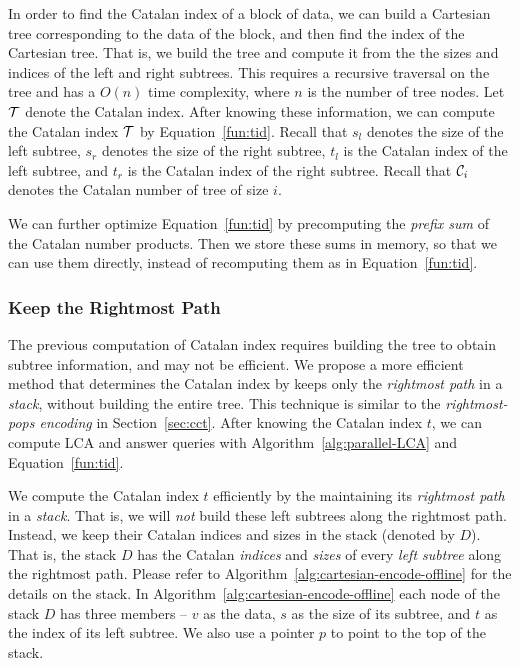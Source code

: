 In order to find the Catalan index of a block of data, we can build a
Cartesian tree corresponding to the data of the block, and then find the
index of the Cartesian tree.  That is, we build the tree and compute it
from the the sizes and indices of the left and right subtrees.  This
requires a recursive traversal on the tree and has a $O(n)$ time
complexity, where $n$ is the number of tree nodes.  Let ${\cal T}$
denote the Catalan index.  After knowing these information, we can
compute the Catalan index ${\cal T}$ by Equation~\ref{fun:tid}.  Recall
that $s_l$ denotes the size of the left subtree, $s_r$ denotes the size
of the right subtree, $t_l$ is the Catalan index of the left subtree,
and $t_r$ is the Catalan index of the right subtree.  Recall that ${\cal
C}_i$ denotes the Catalan number of tree of size $i$.

% 



We can further optimize Equation~\ref{fun:tid} by precomputing the
{\em prefix sum} of the Catalan number products.  Then we store these
sums in memory, so that we can use them directly, instead of
recomputing them as in Equation~\ref{fun:tid}.  


\subsubsection{Keep the Rightmost Path}

The previous computation of Catalan index requires building the tree to
obtain subtree information, and may not be efficient.  We propose a more
efficient method that determines the Catalan index by keeps only the
{\em rightmost path} in a {\em stack}, without building the entire tree.
This technique is similar to the {\em rightmost-pops encoding} in
Section~\ref{sec:cct}.  After knowing the Catalan index $t$, we can
compute LCA and answer queries with Algorithm~\ref{alg:parallel-LCA} and
Equation~\ref{fun:tid}.

We compute the Catalan index $t$ efficiently by the maintaining its {\em
rightmost path} in a {\em stack}.  That is, we will {\em not} build
these left subtrees along the rightmost path.  Instead, we keep their
Catalan indices and sizes in the stack (denoted by $D$).  That is, the
stack $D$ has the Catalan {\em indices} and {\em sizes} of every {\em
left subtree} along the rightmost path.  Please refer to
Algorithm~\ref{alg:cartesian-encode-offline} for the details on the
stack.  In Algorithm~\ref{alg:cartesian-encode-offline} each node of the
stack $D$ has three members -- $v$ as the data, $s$ as the size of its
subtree, and $t$ as the index of its left subtree.  We also use a
pointer $p$ to point to the top of the stack.


